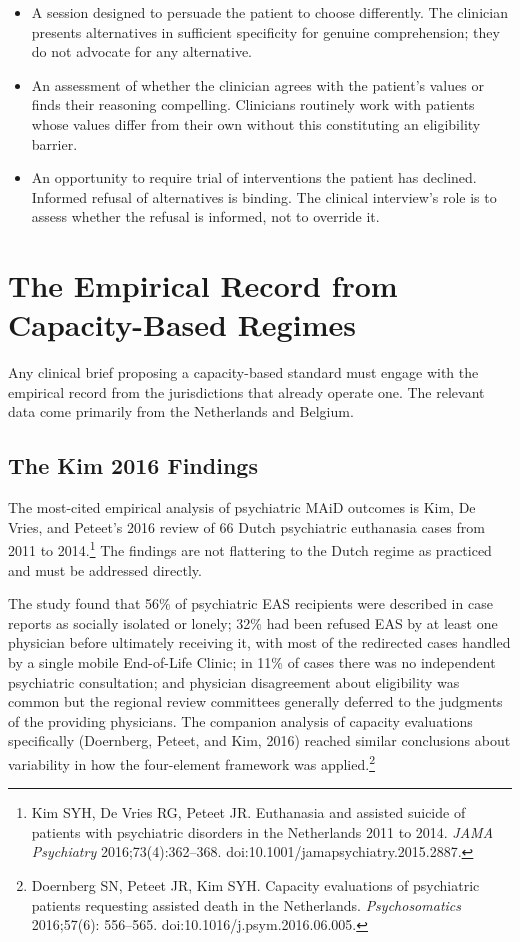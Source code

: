 \documentclass[11pt, letterpaper]{article}
\begin{document}
\begin{itemize}
  \item A session designed to persuade the patient to choose differently. The clinician
    presents alternatives in sufficient specificity for genuine comprehension; they do
    not advocate for any alternative.
  \item An assessment of whether the clinician agrees with the patient's values or
    finds their reasoning compelling. Clinicians routinely work with patients whose
    values differ from their own without this constituting an eligibility barrier.
  \item An opportunity to require trial of interventions the patient has declined.
    Informed refusal of alternatives is binding. The clinical interview's role is
    to assess whether the refusal is informed, not to override it.
\end{itemize}

\section{The Empirical Record from Capacity-Based Regimes}

Any clinical brief proposing a capacity-based standard must engage with the empirical
record from the jurisdictions that already operate one. The relevant data come primarily
from the Netherlands and Belgium.

\subsection{The Kim 2016 Findings}

The most-cited empirical analysis of psychiatric MAiD outcomes is Kim, De Vries, and
Peteet's 2016 review of 66 Dutch psychiatric euthanasia cases from 2011 to
2014.\footnote{%
  Kim SYH, De Vries RG, Peteet JR. Euthanasia and assisted suicide of patients with
  psychiatric disorders in the Netherlands 2011 to 2014. \textit{JAMA Psychiatry}
  2016;73(4):362--368. doi:10.1001/jamapsychiatry.2015.2887.}
The findings are not flattering to the Dutch regime as practiced and must be addressed
directly.

The study found that 56\% of psychiatric EAS recipients were described in case reports
as socially isolated or lonely; 32\% had been refused EAS by at least one physician
before ultimately receiving it, with most of the redirected cases handled by a single
mobile End-of-Life Clinic; in 11\% of cases there was no independent psychiatric
consultation; and physician disagreement about eligibility was common but the regional
review committees generally deferred to the judgments of the providing physicians.
The companion analysis of capacity evaluations specifically (Doernberg, Peteet, and
Kim, 2016) reached similar conclusions about variability in how the four-element
framework was applied.\footnote{%
  Doernberg SN, Peteet JR, Kim SYH. Capacity evaluations of psychiatric patients
  requesting assisted death in the Netherlands. \textit{Psychosomatics} 2016;57(6):
  556--565. doi:10.1016/j.psym.2016.06.005.}
\end{document}
